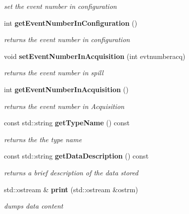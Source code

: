 \begin{DoxyCompactItemize}
\begin{DoxyCompactList}\small\item\em set the event number in configuration \item\end{DoxyCompactList}\item 
int {\bf getEventNumberInConfiguration} ()\label{classCALICE_1_1EventHeader_ac0d6b7781caddb323548dba760c2cd21}

\begin{DoxyCompactList}\small\item\em returns the event number in configuration \item\end{DoxyCompactList}\item 
void {\bf setEventNumberInAcquisition} (int evtnumberacq)
\begin{DoxyCompactList}\small\item\em returns the event number in spill \item\end{DoxyCompactList}\item 
int {\bf getEventNumberInAcquisition} ()\label{classCALICE_1_1EventHeader_aeb2022e92de4b7cc8a28912ccdd52f73}

\begin{DoxyCompactList}\small\item\em returns the event number in Acquisition \item\end{DoxyCompactList}\item 
const std::string {\bf getTypeName} () const \label{classCALICE_1_1EventHeader_a2db92906b475b2c6409c24535a00d7a6}

\begin{DoxyCompactList}\small\item\em returns the the type name \item\end{DoxyCompactList}\item 
const std::string {\bf getDataDescription} () const \label{classCALICE_1_1EventHeader_a52adc9cbf4000c04b5431406f8df1d83}

\begin{DoxyCompactList}\small\item\em returns a brief description of the data stored \item\end{DoxyCompactList}\item 
std::ostream \& {\bf print} (std::ostream \&ostrm)\label{classCALICE_1_1EventHeader_a1067ef9c5904eb8aa9f1438136c1b5de}

\begin{DoxyCompactList}\small\item\em dumps data content \item\end{DoxyCompactList}\end{DoxyCompactItemize}


